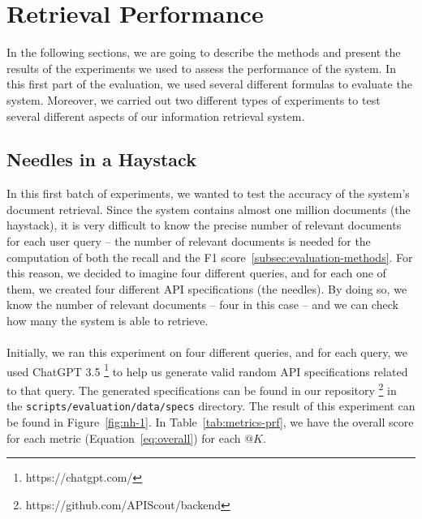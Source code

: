 \section{Retrieval Performance}\label{sec:retrieval-performance}
In the following sections, we are going to describe the methods and present the results of the experiments we used to assess the performance of the system.
In this first part of the evaluation, we used several different formulas to evaluate the system.
Moreover, we carried out two different types of experiments to test several different aspects of our information retrieval system.

\subsection{Needles in a Haystack}\label{subsec:needles-in-a-haystack}
In this first batch of experiments, we wanted to test the accuracy of the system's document retrieval.
Since the system contains almost one million documents (the haystack), it is very difficult to know the precise number of relevant documents for each user query -- the number of relevant documents is needed for the computation of both the recall and the F1 score~\ref{subsec:evaluation-methods}.
For this reason, we decided to imagine four different queries, and for each one of them, we created four different API specifications (the needles).
By doing so, we know the number of relevant documents -- four in this case -- and we can check how many the system is able to retrieve. \\ \\
Initially, we ran this experiment on four different queries, and for each query, we used ChatGPT 3.5 \footnote{https://chatgpt.com/} to help us generate valid random API specifications related to that query.
The generated specifications can be found in our repository \footnote{https://github.com/APIScout/backend} in the \verb|scripts/evaluation/data/specs| directory.
The result of this experiment can be found in Figure~\ref{fig:nh-1}.
In Table~\ref{tab:metrics-prf}, we have the overall score for each metric (Equation~\ref{eq:overall}) for each $@K$.

